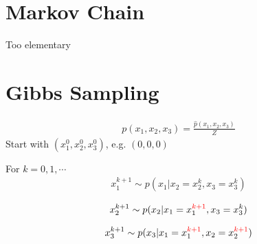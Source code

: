 \documentclass[11pt, oneside, reqno]{amsart}
\numberwithin{equation}{section}
\theoremstyle{plain}%
\theoremstyle{definition}
\theoremstyle{remark}
\begin{document}
\section{Markov Chain}
Too elementary

\section{Gibbs Sampling}
\begin{align*}
	p(x_1,x_2,x_3)=\frac{\widehat{p}(x_1,x_2,x_3)}{Z}
\end{align*}
Start with $(x^0_1,x^0_2,x^0_3)$, e.g. $(0,0,0)$

For $k=0,1,\cdots$
\begin{align*}
	x^{k+1}_1\sim p(x_1|x_2=x^k_2,x_3=x^k_3)
\end{align*}

\begin{align*}
	x^{k+1}_2\sim p(x_2|x_1=x^{{\color{red}{}k+1}}_1,x_3=x^k_3)
\end{align*}

\begin{align*}
	x^{k+1}_3\sim p(x_3|x_1=x^{{\color{red}{}k+1}}_1,x_2=x^{{\color{red}{}k+1}}_2)
\end{align*}
\end{document}
